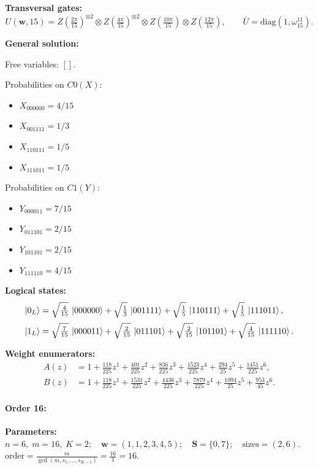 \documentclass[11pt]{article}
\begin{document}
\noindent\textbf{Transversal gates:}
\[
    U(\mathbf w,15)=Z \left(\tfrac{2\pi}{15}\right)^{\otimes2} \otimes Z \left(\tfrac{4\pi}{15}\right)^{\otimes2} \otimes Z \left(\tfrac{10\pi}{15}\right) \otimes Z \left(\tfrac{12\pi}{15}\right),\qquad
    \overline U=\mathrm{diag}(1,\omega_{15}^{11}).
\]

\noindent\textbf{General solution:}

Free variables: $[]$.

Probabilities on $C0 (X)$:
\begin{itemize}
    \item $X_{000000} = 4/15$
    \item $X_{001111} = 1/3$
    \item $X_{110111} = 1/5$
    \item $X_{111011} = 1/5$
\end{itemize}

Probabilities on $C1 (Y)$:
\begin{itemize}
    \item $Y_{000011} = 7/15$
    \item $Y_{011101} = 2/15$
    \item $Y_{101101} = 2/15$
    \item $Y_{111110} = 4/15$
\end{itemize}

\noindent\textbf{Logical states:}
\begin{align*}
\ket{0_L} &= \sqrt{\tfrac{4}{15}}\,\ket{000000} + \sqrt{\tfrac{1}{3}}\,\ket{001111} + \sqrt{\tfrac{1}{5}}\,\ket{110111} + \sqrt{\tfrac{1}{5}}\,\ket{111011},
\\[2pt]
\ket{1_L} &= \sqrt{\tfrac{7}{15}}\,\ket{000011} + \sqrt{\tfrac{2}{15}}\,\ket{011101} + \sqrt{\tfrac{2}{15}}\,\ket{101101} + \sqrt{\tfrac{4}{15}}\,\ket{111110}.
\end{align*}

\noindent\textbf{Weight enumerators:}
\begin{align*}
A(z) &= 1 + \tfrac{118}{225}z^{1} + \tfrac{401}{225}z^{2} + \tfrac{836}{225}z^{3} + \tfrac{1523}{225}z^{4} + \tfrac{294}{25}z^{5} + \tfrac{1451}{225}z^{6},\\[2pt]
B(z) &= 1 + \tfrac{118}{225}z^{1} + \tfrac{1531}{225}z^{2} + \tfrac{4436}{225}z^{3} + \tfrac{7879}{225}z^{4} + \tfrac{1094}{25}z^{5} + \tfrac{953}{45}z^{6}.
\end{align*}

\paragraph{\textbf{Order 16:}}
\noindent\textbf{Parameters:} $n=6,\; m=16,\; K=2;\quad \mathbf w=(1, 1, 2, 3, 4, 5);\quad \mathbf S=\{0, 7\};\quad \text{sizes}=\left(2, 6\right).$ $\displaystyle \text{order}=\frac{m}{\gcd(m,s_1,\dots,s_{K-1})}=\frac{16}{1}=16.$
\end{document}
